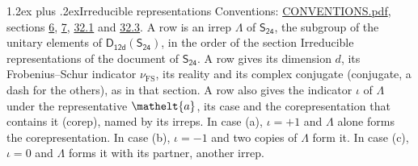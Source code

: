 \documentclass[10pt,a4paper]{article}
\makeatletter
\renewcommand\section{\@startsection{section}{1}{\z@}{-3ex plus -1ex minus -.2ex}%
  {1.2ex plus .2ex}{\normalfont\large\sffamily\bfseries\color{parttitle}}}
\numberwithin{equation}{section}
\newcommand{\eltfont}[1]{{\let\sigma\eltsigma\mathelt{#1}}}
\newcommand{\grp}[1]{\mathsf{#1}}
\newcommand{\elt}[1]{\eltfont{#1}}
\newcommand{\fsind}{\nu_{\mathrm{FS}}}
\makeatother
\begin{document}
\section{Irreducible representations}\label{s:irreps}
Conventions: \href{../../CONVENTIONS.pdf}{CONVENTIONS.pdf}, sections \href{../../../rotation/CONVENTIONS.pdf\#conv.6}{6}, \href{../../../rotation/CONVENTIONS.pdf\#conv.7}{7}, \href{../../CONVENTIONS.pdf\#conv.32.1}{32.1} and \href{../../CONVENTIONS.pdf\#conv.32.3}{32.3}.
\leavevmode\label{n:irrep.Delta}A row is an irrep $\Lambda$ of $\grp{S_{24}}$, the subgroup of the unitary elements of $\grp{D_{12d}}(\grp{S_{24}})$, in the order of the section Irreducible representations of the document of \href{../../../rotation/data/pdf/S24.pdf}{$\grp{S_{24}}$}. \label{n:index.dimension}\label{n:index.frobenius}\label{n:head.irrep}\label{n:head.reality}\label{n:head.conjugate}A row gives its dimension $d$, its Frobenius--Schur indicator $\fsind$, its reality and its complex conjugate (conjugate, a dash for the others), as in that section. \label{n:head.case.corep}\label{n:head.corep}A row also gives the indicator $\iota$ of $\Lambda$ under the representative $\elt{a}$, its case and the corepresentation that contains it (corep), named by its irreps. In case (a), $\iota = +1$ and $\Lambda$ alone forms the corepresentation. In case (b), $\iota = -1$ and two copies of $\Lambda$ form it. In case (c), $\iota = 0$ and $\Lambda$ forms it with its partner, another irrep.
\setlength{\emergencystretch}{2em}\par\setlength{\emergencystretch}{0pt}
\end{document}
